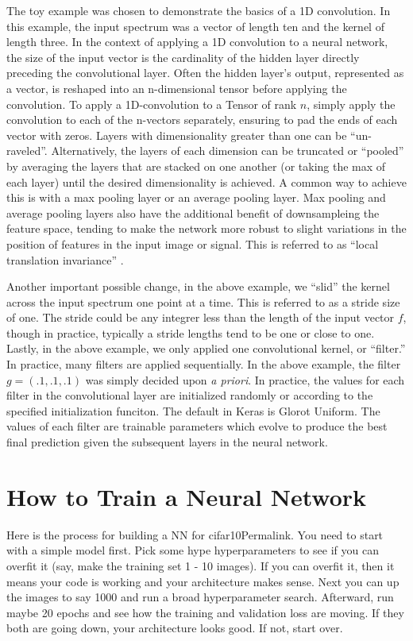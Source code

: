 The toy example was chosen to demonstrate the basics of a 1D convolution. In this example, the input spectrum was a vector of length ten and the kernel of length three. In the context of applying a 1D convolution to a neural network, the size of the input vector is the cardinality of the hidden layer directly preceding the convolutional layer. Often the hidden layer's output, represented as a vector, is reshaped into an n-dimensional tensor before applying the convolution. To apply a 1D-convolution to a Tensor of rank $ n $, simply apply the convolution to each of the n-vectors separately, ensuring to pad the ends of each vector with zeros. Layers with dimensionality greater than one can be ``un-raveled''. Alternatively, the layers of each dimension can be truncated or ``pooled'' by averaging the layers that are stacked on one another (or taking the max of each layer) until the desired dimensionality is achieved. A common way to achieve this is with a max pooling layer or an average pooling layer. Max pooling and average pooling layers also have the additional benefit of downsampleing the feature space, tending to make the network more robust to slight variations in the position of features in the input image or signal. This is referred to as ``local translation invariance'' \cite{local-translation-invariance}.

Another important possible change, in the above example, we ``slid'' the kernel across the input spectrum one point at a time. This is referred to as a stride size of one. The stride could be any integrer less than the length of the input vector $ f $, though in practice, typically a stride lengths tend to be one or close to one. Lastly, in the above example, we only applied one convolutional kernel, or ``filter.'' In practice, many filters are applied sequentially. In the above example, the filter $ g = (.1, .1, .1) $ was simply decided upon \textit{a priori}. In practice, the values for each filter in the convolutional layer are initialized randomly or according to the specified initialization funciton. The default in Keras is Glorot Uniform. The values of each filter are trainable parameters which evolve to produce the best final prediction given the subsequent layers in the neural network.


\section{How to Train a Neural Network}
Here is the process for building a NN for cifar10Permalink.
You need to start with a simple model first. Pick some hype hyperparameters to see if you can overfit it (say, make the training set 1 - 10 images). If you can overfit it, then it means your code is working and your architecture makes sense. Next you can up the images to say 1000 and run a broad hyperparameter search. Afterward, run maybe 20 epochs and see how the training and validation loss are moving. If they both are going down, your architecture looks good. If not, start over.

